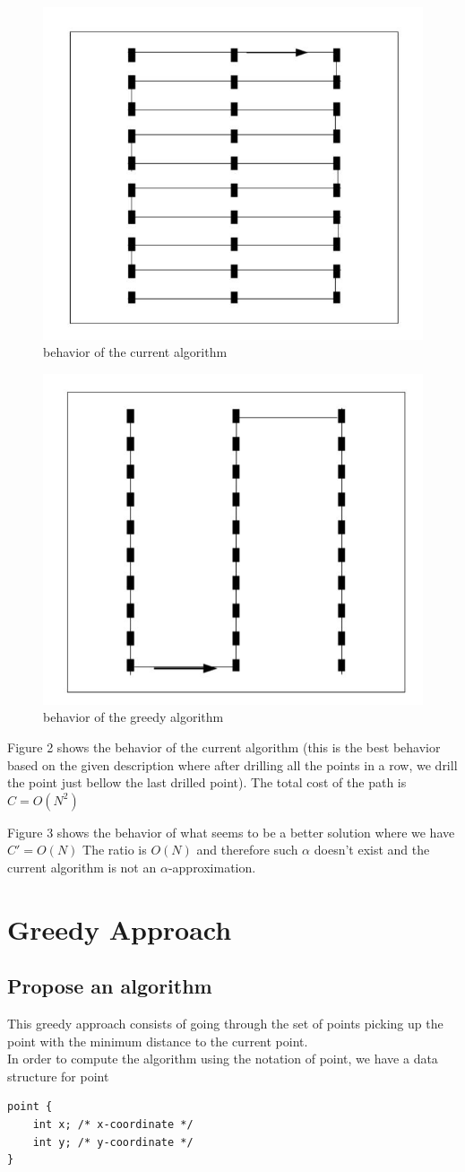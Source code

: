 \documentclass{article}
\begin{document}
\begin{figure}[h]
\centering \includegraphics[width=0.3\linewidth]{F1.jpg}
\caption{behavior of the current algorithm}
\end{figure}

\begin{figure}[h]
\centering \includegraphics[width=0.3\linewidth]{F2.jpg}
\caption{behavior of the greedy algorithm}
\end{figure}

Figure 2 shows the behavior of the current algorithm (this is the best behavior based on the given description where after drilling all the points in a row, we drill the point just bellow the last drilled point). The total cost of the path is 
$C = O(N^{2})$

Figure 3 shows the behavior of what seems to be a better solution where we have $C' = O(N)$
The ratio is $O(N)$ and therefore such $\alpha$ doesn't exist and the current algorithm is not an $\alpha$-approximation.

\section{Greedy Approach}
\subsection{Propose an algorithm}
This greedy approach consists of going through the set of points picking up the point with the minimum distance to the current point.\\

In order to compute the algorithm using the notation of point, we have a data structure for point
\begin{lstlisting}
point {
	int x; /* x-coordinate */
	int y; /* y-coordinate */
}
\end{lstlisting}
\end{document}
